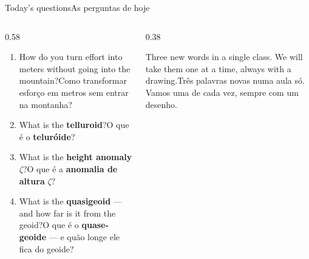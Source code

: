\documentclass[aspectratio=169,11pt]{beamer}
\newcommand{\tr}[2]{\ifEN#2\else#1\fi}
\begin{document}
\begin{frame}{\tr{As perguntas de hoje}{Today's questions}}
  \begin{columns}[T]
    \begin{column}{0.58\textwidth}
      \begin{enumerate}
        \setlength{\itemsep}{8pt}
        \item \tr{Como transformar esforço em metros sem entrar na montanha?}{How do you turn
              effort into meters without going into the mountain?}
        \item \tr{O que é o \textcolor{corIdeal}{\textbf{teluróide}}?}{What is the
              \textcolor{corIdeal}{\textbf{telluroid}}?}
        \item \tr{O que é a \textcolor{corQuase}{\textbf{anomalia de altura}} $\zeta$?}{What is
              the \textcolor{corQuase}{\textbf{height anomaly}} $\zeta$?}
        \item \tr{O que é o \textcolor{corQuase}{\textbf{quase-geoide}} --- e quão longe ele
              fica do geoide?}{What is the \textcolor{corQuase}{\textbf{quasigeoid}} --- and
              how far is it from the geoid?}
      \end{enumerate}
    \end{column}
    \begin{column}{0.38\textwidth}
      \begin{cuidado}[title={\tr{Devagar}{Slowly}}]
        \tr{Três palavras novas numa aula só. Vamos uma de cada vez, sempre com um
        desenho.}{Three new words in a single class. We will take them one at a time, always
        with a drawing.}
      \end{cuidado}
    \end{column}
  \end{columns}
\end{frame}
\end{document}
